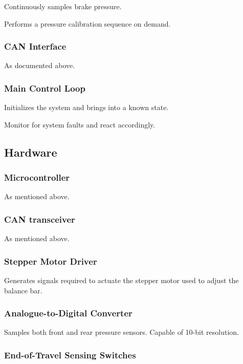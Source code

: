 Continuously samples brake pressure.

Performs a pressure calibration sequence on demand.


\subsubsection{CAN Interface}

As documented above.


\subsubsection{Main Control Loop}

Initializes the system and brings into a known state.

Monitor for system faults and react accordingly.


\subsection{Hardware}


\subsubsection{Microcontroller}

As mentioned above.


\subsubsection{CAN transceiver}

As mentioned above.


\subsubsection{Stepper Motor Driver}

Generates signals required to actuate the stepper motor used to adjust
the balance bar.


\subsubsection{Analogue-to-Digital Converter}

Samples both front and rear pressure sensors. Capable of 10-bit resolution.


\subsubsection{End-of-Travel Sensing Switches}